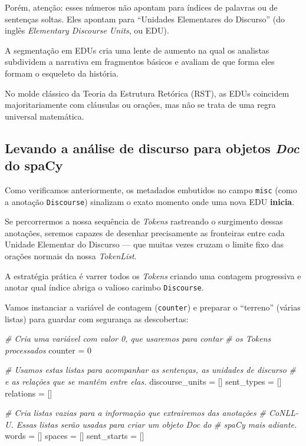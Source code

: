 \documentclass[
  brazilian,
]{article}
\newenvironment{Shaded}{}{}
\newcommand{\CommentTok}[1]{\textcolor[rgb]{0.38,0.63,0.69}{\textit{#1}}}
\newcommand{\DecValTok}[1]{\textcolor[rgb]{0.25,0.63,0.44}{#1}}
\newcommand{\NormalTok}[1]{#1}
\newcommand{\OperatorTok}[1]{\textcolor[rgb]{0.40,0.40,0.40}{#1}}
\begin{document}
Porém, atenção: esses números não apontam para índices de palavras ou de
sentenças soltas. Eles apontam para ``Unidades Elementares do Discurso''
(do inglês \emph{Elementary Discourse Units}, ou EDU).

A segmentação em EDUs cria uma lente de aumento na qual os analistas
subdividem a narrativa em fragmentos básicos e avaliam de que forma eles
formam o esqueleto da história.

No molde clássico da Teoria da Estrutura Retórica (RST), as EDUs
coincidem majoritariamente com cláusulas ou orações, mas não se trata de
uma regra universal matemática.

\hypertarget{levando-a-anuxe1lise-de-discurso-para-objetos-doc-do-spacy}{%
\subsection{\texorpdfstring{Levando a análise de discurso para objetos
\emph{Doc} do
spaCy}{Levando a análise de discurso para objetos Doc do spaCy}}\label{levando-a-anuxe1lise-de-discurso-para-objetos-doc-do-spacy}}

Como verificamos anteriormente, os metadados embutidos no campo
\texttt{misc} (como a anotação \texttt{Discourse}) sinalizam o exato
momento onde uma nova EDU \textbf{inicia}.

Se percorrermos a nossa sequência de \emph{Tokens} rastreando o
surgimento dessas anotações, seremos capazes de desenhar precisamente as
fronteiras entre cada Unidade Elementar do Discurso --- que muitas vezes
cruzam o limite fixo das orações normais da nossa \emph{TokenList}.

A estratégia prática é varrer todos os \emph{Tokens} criando uma
contagem progressiva e anotar qual índice abriga o valioso carimbo
\texttt{Discourse}.

Vamos instanciar a variável de contagem (\texttt{counter}) e preparar o
``terreno'' (várias listas) para guardar com segurança as descobertas:

\begin{Shaded}
\begin{Highlighting}[]
\CommentTok{\# Cria uma variável com valor 0, que usaremos para contar}
\CommentTok{\# os Tokens processados}
\NormalTok{counter }\OperatorTok{=} \DecValTok{0}

\CommentTok{\# Usamos estas listas para acompanhar as sentenças, as unidades de discurso}
\CommentTok{\# e as relações que se mantêm entre elas.}
\NormalTok{discourse\_units }\OperatorTok{=}\NormalTok{ []}
\NormalTok{sent\_types }\OperatorTok{=}\NormalTok{ []}
\NormalTok{relations }\OperatorTok{=}\NormalTok{ []}

\CommentTok{\# Cria listas vazias para a informação que extrairemos das anotações}
\CommentTok{\# CoNLL{-}U. Essas listas serão usadas para criar um objeto Doc do}
\CommentTok{\# spaCy mais adiante.}
\NormalTok{words }\OperatorTok{=}\NormalTok{ []}
\NormalTok{spaces }\OperatorTok{=}\NormalTok{ []}
\NormalTok{sent\_starts }\OperatorTok{=}\NormalTok{ []}
\end{Highlighting}
\end{Shaded}
\end{document}

